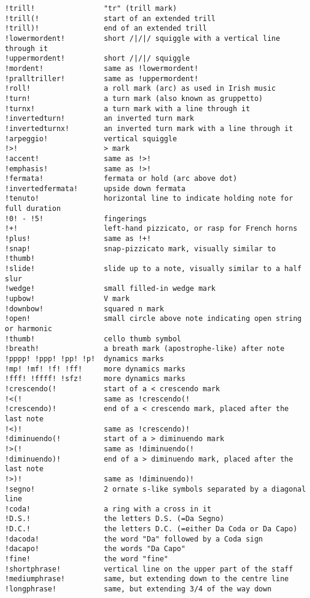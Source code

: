 \begin{verbatim}
!trill!                "tr" (trill mark)
!trill(!               start of an extended trill
!trill)!               end of an extended trill
!lowermordent!         short /|/|/ squiggle with a vertical line through it
!uppermordent!         short /|/|/ squiggle
!mordent!              same as !lowermordent!
!pralltriller!         same as !uppermordent!
!roll!                 a roll mark (arc) as used in Irish music
!turn!                 a turn mark (also known as gruppetto)
!turnx!                a turn mark with a line through it
!invertedturn!         an inverted turn mark
!invertedturnx!        an inverted turn mark with a line through it
!arpeggio!             vertical squiggle
!>!                    > mark
!accent!               same as !>!
!emphasis!             same as !>!
!fermata!              fermata or hold (arc above dot)
!invertedfermata!      upside down fermata
!tenuto!               horizontal line to indicate holding note for full duration
!0! - !5!              fingerings
!+!                    left-hand pizzicato, or rasp for French horns
!plus!                 same as !+!
!snap!                 snap-pizzicato mark, visually similar to !thumb!
!slide!                slide up to a note, visually similar to a half slur
!wedge!                small filled-in wedge mark
!upbow!                V mark
!downbow!              squared n mark
!open!                 small circle above note indicating open string or harmonic
!thumb!                cello thumb symbol
!breath!               a breath mark (apostrophe-like) after note
!pppp! !ppp! !pp! !p!  dynamics marks
!mp! !mf! !f! !ff!     more dynamics marks
!fff! !ffff! !sfz!     more dynamics marks
!crescendo(!           start of a < crescendo mark
!<(!                   same as !crescendo(!
!crescendo)!           end of a < crescendo mark, placed after the last note
!<)!                   same as !crescendo)!
!diminuendo(!          start of a > diminuendo mark
!>(!                   same as !diminuendo(!
!diminuendo)!          end of a > diminuendo mark, placed after the last note
!>)!                   same as !diminuendo)!
!segno!                2 ornate s-like symbols separated by a diagonal line
!coda!                 a ring with a cross in it
!D.S.!                 the letters D.S. (=Da Segno)
!D.C.!                 the letters D.C. (=either Da Coda or Da Capo)
!dacoda!               the word "Da" followed by a Coda sign
!dacapo!               the words "Da Capo"
!fine!                 the word "fine"
!shortphrase!          vertical line on the upper part of the staff
!mediumphrase!         same, but extending down to the centre line
!longphrase!           same, but extending 3/4 of the way down
\end{verbatim}

